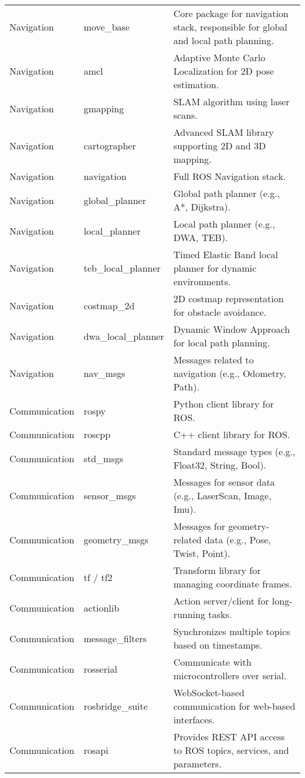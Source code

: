 \documentclass[../../main]{subfiles}
\begin{document}
\begin{longtable}{|>{\raggedright\arraybackslash}p{4cm}|>{\raggedright\arraybackslash}p{4cm}|p{7cm}|}
Navigation & move\_base & Core package for navigation stack, responsible for global and local path planning. \\
Navigation & amcl & Adaptive Monte Carlo Localization for 2D pose estimation. \\
Navigation & gmapping & SLAM algorithm using laser scans. \\
Navigation & cartographer & Advanced SLAM library supporting 2D and 3D mapping. \\
Navigation & navigation & Full ROS Navigation stack. \\
Navigation & global\_planner & Global path planner (e.g., A*, Dijkstra). \\
Navigation & local\_planner & Local path planner (e.g., DWA, TEB). \\
Navigation & teb\_local\_planner & Timed Elastic Band local planner for dynamic environments. \\
Navigation & costmap\_2d & 2D costmap representation for obstacle avoidance. \\
Navigation & dwa\_local\_planner & Dynamic Window Approach for local path planning. \\
Navigation & nav\_msgs & Messages related to navigation (e.g., Odometry, Path). \\

Communication & rospy & Python client library for ROS. \\
Communication & roscpp & C++ client library for ROS. \\
Communication & std\_msgs & Standard message types (e.g., Float32, String, Bool). \\
Communication & sensor\_msgs & Messages for sensor data (e.g., LaserScan, Image, Imu). \\
Communication & geometry\_msgs & Messages for geometry-related data (e.g., Pose, Twist, Point). \\
Communication & tf / tf2 & Transform library for managing coordinate frames. \\
Communication & actionlib & Action server/client for long-running tasks. \\
Communication & message\_filters & Synchronizes multiple topics based on timestamps. \\
Communication & rosserial & Communicate with microcontrollers over serial. \\
Communication & rosbridge\_suite & WebSocket-based communication for web-based interfaces. \\
Communication & rosapi & Provides REST API access to ROS topics, services, and parameters. \\


\end{longtable}
\end{document}
